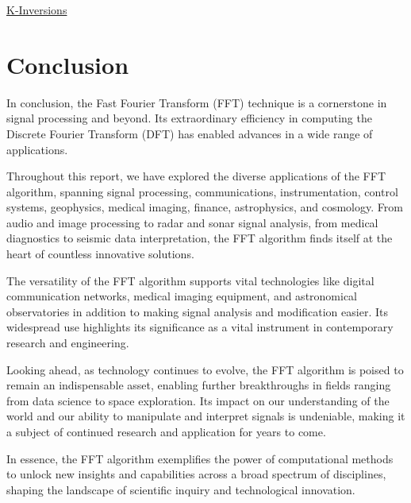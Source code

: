 \documentclass{report}
\begin{document}
\href{https://open.kattis.com/problems/kinversions}{K-Inversions}

\chapter{Conclusion}

In conclusion, the Fast Fourier Transform (FFT) technique is a cornerstone in signal processing and beyond. Its extraordinary efficiency in computing the Discrete Fourier Transform (DFT) has enabled advances in a wide range of applications.

Throughout this report, we have explored the diverse applications of the FFT algorithm, spanning signal processing, communications, instrumentation, control systems, geophysics, medical imaging, finance, astrophysics, and cosmology. From audio and image processing to radar and sonar signal analysis, from medical diagnostics to seismic data interpretation, the FFT algorithm finds itself at the heart of countless innovative solutions.

The versatility of the FFT algorithm supports vital technologies like digital communication networks, medical imaging equipment, and astronomical observatories in addition to making signal analysis and modification easier. Its widespread use highlights its significance as a vital instrument in contemporary research and engineering.

Looking ahead, as technology continues to evolve, the FFT algorithm is poised to remain an indispensable asset, enabling further breakthroughs in fields ranging from data science to space exploration. Its impact on our understanding of the world and our ability to manipulate and interpret signals is undeniable, making it a subject of continued research and application for years to come.

In essence, the FFT algorithm exemplifies the power of computational methods to unlock new insights and capabilities across a broad spectrum of disciplines, shaping the landscape of scientific inquiry and technological innovation.
\end{document}
